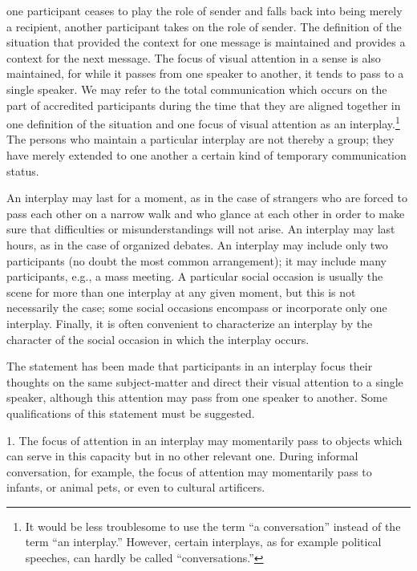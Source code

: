 \documentclass[openany,nobib]{tufte-book}
\begin{document}
one participant ceases to play the role of sender and falls back into
being merely a recipient, another participant takes on the role of
sender. The definition of the situation that provided the context for
one message is maintained and provides a context for the next message.
The focus of visual attention in a sense is also maintained, for while
it passes from one speaker to another, it tends to pass to a single
speaker. We may refer to the total communication which occurs on the
part of accredited participants during the time that they are aligned
together in one definition of the situation and one focus of visual
attention as an interplay.\footnote{It would be less troublesome to use
  the term ``a conversation'' instead of the term ``an interplay.''
  However, certain interplays, as for example political speeches, can
  hardly be called ``conversations.''} The persons who maintain a
particular interplay are not thereby a group; they have merely extended
to one another a certain kind of temporary communication status.

An interplay may last for a moment, as in the case of strangers who are
forced to pass each other on a narrow walk and who glance at each other
in order to make sure that difficulties or misunderstandings will not
arise. An interplay may last hours, as in the case of organized debates.
An interplay may include only two participants (no doubt the most common
arrangement); it may include many participants, e.g., a mass meeting. A
particular social occasion is usually the scene for more than one
interplay at any given moment, but this is not necessarily the case;
some social occasions encompass or incorporate only one interplay.
Finally, it is often convenient to characterize an interplay by the
character of the social occasion in which the interplay occurs.

The statement has been made that participants in an interplay focus
their thoughts on the same subject-matter and direct their visual
attention to a single speaker, although this attention may pass from one
speaker to another. Some qualifications of this statement must be
suggested.

\enlargethispage{\baselineskip}

1. The focus of attention in an interplay may momentarily pass to
objects which can serve in this capacity but in no other relevant one.
During informal conversation, for example, the focus of attention may
momentarily pass to infants, or animal pets, or even to cultural
artificers.
\end{document}
